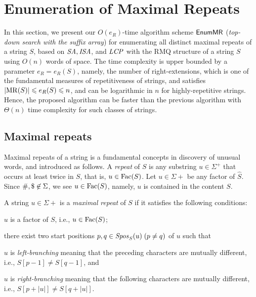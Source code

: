 \section{Enumeration of Maximal Repeats}
\label{sec:algo}
In this section, we present our $O(e_R)$-time algorithm scheme $\MREnum$ (\textit{top-down search with the suffix array}) for enumerating all distinct maximal repeats of a string $S$,  based on $\SA, \ISA$, and $\LCP$ with the RMQ structure of a string $S$ using $O(n)$ words of space. The time complexity is upper bounded by a parameter $e_R = e_R(S)$, namely, the number of right-extensions, which is one of the fundamental measures of repetitiveness of strings, and satisfies $|\MR(S)| \le e_R(S) \le n$, and can be logarithmic in $n$ for highly-repetitive strings. Hence, the proposed algorithm can be faster than the previous algorithm with $\Theta(n)$ time complexity for such classes of strings. 

\subsection{Maximal repeats}
Maximal repeats of a string is a fundamental concepts in discovery of unusual words, and introduced as follows.  
A \textit{repeat} of $S$ is any substring $u \in \Sigma^+$ that occurs at least twice in $S$, that is, $u \in \Fac(S)$.
Let $u \in \Sigma+$ be any factor of $\hat S$. Since $\#, \daller \not\in \Sigma$, we see $u \in \Fac(S)$, namely, $u$ is contained in the content $S$.

\begin{definition}\rm 
A string $u \in \Sigma+$ is a \textit{maximal repeat} of $S$ if it satisfies the following conditions: 
\begin{enumerate*}[(1)]
\item $u$ is a factor of $S$, i.e., $u \in \Fac(S)$;  
\item there exist two start positions $p, q \in \Spos[S](u)\;(p\not= q)$ of $u$ such that
  \begin{enumerate*}[(i)]
  \item $u$ is \textit{left-branching} meaning that the preceding characters are mutually different, i.e., $S[p-1] \not= S[q-1]$, and
  \item $u$ is \textit{right-branching} meaning that the following characters are mutually different, i.e., $S[p+|u|] \not= S[q+|u|]$. 
  \end{enumerate*}
\end{enumerate*}
\end{definition}

